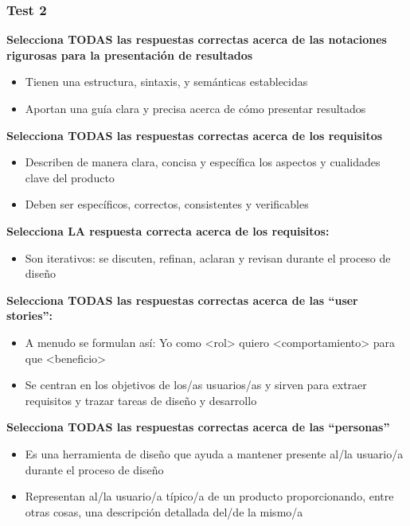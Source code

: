 \documentclass[12pt, twoside, openright]{report} %
\begin{document}
\subsubsection{Test 2}

\textbf{Selecciona TODAS las respuestas correctas acerca de las notaciones rigurosas para la presentación de resultados}
\begin{itemize}
	\item Tienen una estructura, sintaxis, y semánticas establecidas
	\item Aportan una guía clara y precisa acerca de cómo presentar resultados
\end{itemize}

\textbf{Selecciona TODAS las respuestas correctas acerca de los requisitos}
\begin{itemize}
	\item Describen de manera clara, concisa y específica los aspectos y cualidades clave del producto
	\item Deben ser específicos, correctos, consistentes y verificables
\end{itemize}

\textbf{Selecciona LA respuesta correcta acerca de los requisitos:}
\begin{itemize}
	\item Son iterativos: se discuten, refinan, aclaran y revisan durante el proceso de diseño
\end{itemize}

\textbf{Selecciona TODAS las respuestas correctas acerca de las \enquote{user stories}:}
\begin{itemize}
	\item A menudo se formulan así: Yo como <rol> quiero <comportamiento> para que <beneficio>
	\item Se centran en los objetivos de los/as usuarios/as y sirven para extraer requisitos y trazar tareas de diseño y desarrollo
\end{itemize}

\textbf{Selecciona TODAS las respuestas correctas acerca de las \enquote{personas}}
\begin{itemize}
	\item Es una herramienta de diseño que ayuda a mantener presente al/la usuario/a durante el proceso de diseño
	\item Representan al/la usuario/a típico/a de un producto proporcionando, entre otras cosas,  una descripción detallada del/de la mismo/a
\end{itemize}
\end{document}
